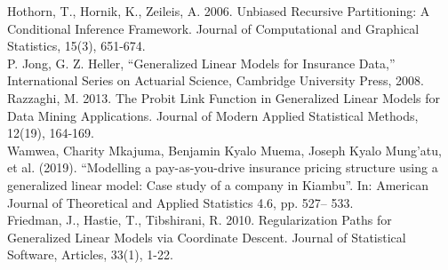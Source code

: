 \documentclass[12pt,a4paper,oneside]{Thesis}
\numberwithin{equation}{section}
\begin{document}
\label{References}
\References
\printbibliography[title={References}]
Hothorn, T., Hornik, K., Zeileis, A. 2006. Unbiased Recursive Partitioning: A Conditional Inference
Framework. Journal of Computational and Graphical Statistics, 15(3), 651-674.\\
P. Jong, G. Z. Heller, “Generalized Linear Models for Insurance 
Data,” International Series on Actuarial Science, Cambridge 
University Press, 2008. \\
Razzaghi, M. 2013. The Probit Link Function in
Generalized Linear Models for Data Mining Applications. Journal of Modern Applied Statistical Methods, 12(19), 164-169.\\
Wamwea, Charity Mkajuma, Benjamin Kyalo Muema, Joseph Kyalo Mung’atu, et al. (2019). “Modelling a pay-as-you-drive insurance pricing structure using a generalized linear model: Case study
of a company in Kiambu”. In: American Journal of Theoretical and Applied Statistics 4.6, pp. 527–
533.\\
Friedman, J., Hastie, T., Tibshirani, R. 2010. Regularization Paths for Generalized Linear Models via Coordinate Descent. Journal of Statistical Software, Articles, 33(1), 1-22.\\

\appendix

\backmatter
\end{document}
